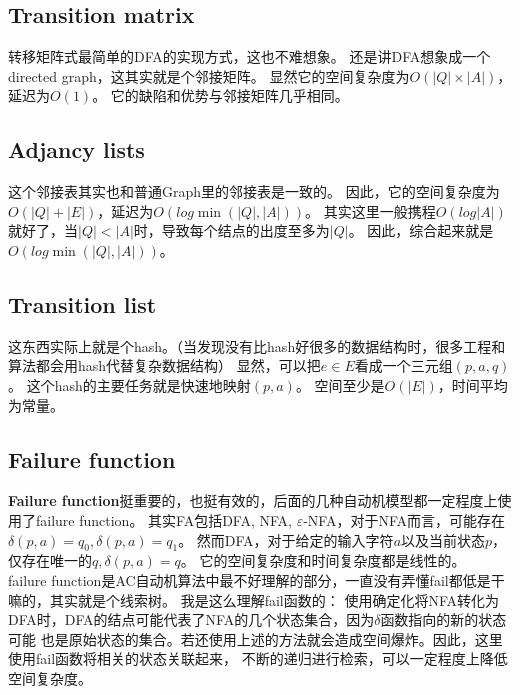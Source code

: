 \documentclass[UTF8]{ctexart}
\theoremstyle{definition}
\theoremstyle{remark}
\numberwithin{equation}{subsection}
\newcommand{\Emph}{\textbf}
\begin{document}
\subsection{Transition matrix}

	转移矩阵式最简单的DFA的实现方式，这也不难想象。
	还是讲DFA想象成一个directed graph，这其实就是个邻接矩阵。
	显然它的空间复杂度为$O(|Q| \times |A|)$，延迟为$O(1)$。
	它的缺陷和优势与邻接矩阵几乎相同。
	
\subsection{Adjancy lists}
	
	这个邻接表其实也和普通Graph里的邻接表是一致的。
	因此，它的空间复杂度为$O(|Q| + |E|)$，延迟为$O(log \min(|Q|, |A|))$。
	其实这里一般携程$O(log |A|)$就好了，当$|Q|<|A|$时，导致每个结点的出度至多为$|Q|$。
	因此，综合起来就是$O(log \min(|Q|, |A|))$。
	
\subsection{Transition list}
	
	这东西实际上就是个hash。（当发现没有比hash好很多的数据结构时，很多工程和算法都会用hash代替复杂数据结构）
	显然，可以把$e \in E$看成一个三元组$(p, a, q)$。
	这个hash的主要任务就是快速地映射$(p,a)$。
	空间至少是$O(|E|)$，时间平均为常量。
	
\subsection{Failure function}
	
	\Emph{Failure function}挺重要的，也挺有效的，后面的几种自动机模型都一定程度上使用了failure function。
	其实FA包括DFA, NFA, $\varepsilon$-NFA，对于NFA而言，可能存在$\delta(p,a)=q_0, \delta(p,a)=q_1$。
	然而DFA，对于给定的输入字符$a$以及当前状态$p$，仅存在唯一的$q, \delta(p,a)=q$。
	它的空间复杂度和时间复杂度都是线性的。	\\
	
	failure function是AC自动机算法中最不好理解的部分，一直没有弄懂fail都低是干嘛的，其实就是个线索树。
	我是这么理解fail函数的：
	使用确定化将NFA转化为DFA时，DFA的结点可能代表了NFA的几个状态集合，因为$\delta$函数指向的新的状态可能
	也是原始状态的集合。若还使用上述的方法就会造成空间爆炸。因此，这里使用fail函数将相关的状态关联起来，
	不断的递归进行检索，可以一定程度上降低空间复杂度。
	
\end{document}
